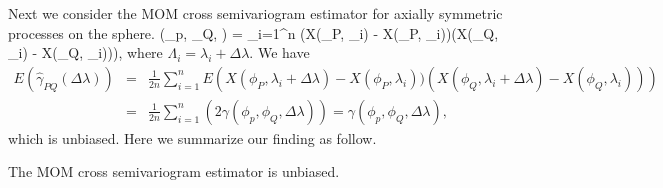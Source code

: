 Next we consider the MOM cross semivariogram estimator for axially symmetric processes on the sphere.				
			\beq \label{cross_variogram}
			\hat{\gamma}(\phi_p, \phi_Q, \Delta\lambda) =  \sum_{i=1}^n \left(X(\phi_P, \Lambda_i) - X(\phi_P, \lambda_i))(X(\phi_Q, \Lambda_i) - X(\phi_Q, \lambda_i))\right),
			\eeq
where $\Lambda_i = \lambda_i+\Delta \lambda$. We have
			\begin{eqnarray*}
				E(\hat{\gamma}_{PQ}(\Delta \lambda)) &=& \frac{1}{2n} \sum_{i=1}^n E\left(X(\phi_P, \lambda_i+\Delta \lambda) - X(\phi_P, \lambda_i))(X(\phi_Q, \lambda_i+\Delta \lambda) - X(\phi_Q, \lambda_i))\right) \\
				&=& \frac{1}{2n} \sum_{i=1}^n \left( 2\gamma(\phi_p, \phi_Q, \Delta\lambda) \right) = \gamma(\phi_p, \phi_Q, \Delta\lambda),
			\end{eqnarray*}
			which is unbiased. Here we summarize our finding as follow. \\

\begin{prop}
The MOM cross semivariogram estimator is unbiased.
\end{prop}
				
				
%			
			
